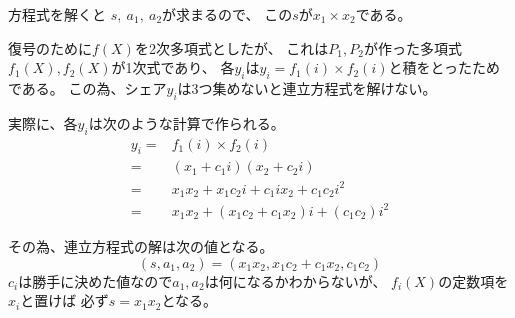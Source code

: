 \documentclass[12pt,b5paper]{ltjsarticle}
\begin{document}
方程式を解くと
$s, \ a_1, \ a_2$が求まるので、
この$s$が$x_1\times x_2$である。

\dotfill


復号のために$f(X)$を2次多項式としたが、
これは$P_1,P_2$が作った多項式$f_1(X),f_2(X)$が1次式であり、
各$y_i$は$y_i=f_1(i)\times f_2(i)$と積をとったためである。
この為、シェア$y_i$は3つ集めないと連立方程式を解けない。

実際に、各$y_i$は次のような計算で作られる。
\begin{align}
 y_i =& f_1(i)\times f_2(i)\\
 =& (x_1 + c_1i)(x_2 + c_2i)\\
 =& x_1x_2 + x_1c_2i + c_1ix_2 + c_1c_2i^2\\
 =& x_1x_2 + (x_1c_2 + c_1x_2)i + (c_1c_2)i^2
\end{align}

その為、連立方程式の解は次の値となる。
\begin{equation}
 (s,a_1,a_2)=(x_1x_2, x_1c_2 + c_1x_2, c_1c_2)
\end{equation}
$c_i$は勝手に決めた値なので$a_1,a_2$は何になるかわからないが、
$f_i(X)$の定数項を$x_i$と置けば
必ず$s=x_1x_2$となる。


\hrulefill
\end{document}
